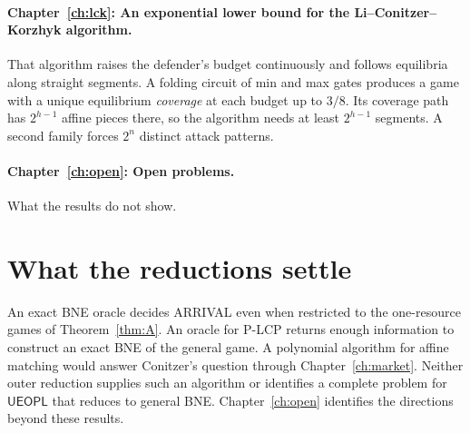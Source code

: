 \paragraph{Chapter~\ref{ch:lck}: An exponential lower bound for the Li--Conitzer--Korzhyk algorithm.} That algorithm raises
the defender's budget continuously and follows equilibria along straight segments. A folding circuit of
min and max gates produces a game with a unique equilibrium \emph{coverage}
at each budget up to $3/8$. Its coverage path has $2^{h-1}$ affine pieces there, so the algorithm
needs at least $2^{h-1}$ segments. A second family forces $2^n$ distinct attack patterns.

\paragraph{Chapter~\ref{ch:open}: Open problems.} What the results do not show.

\section{What the reductions settle}

An exact BNE oracle decides ARRIVAL even when restricted to the one-resource
games of Theorem~\ref{thm:A}. An oracle for P-LCP returns enough information
to construct an exact BNE of the general game. A polynomial algorithm for
affine matching would answer Conitzer's question through Chapter~\ref{ch:market}.
Neither outer reduction supplies such an algorithm or identifies a complete
problem for $\mathsf{UEOPL}$ that reduces to general BNE. Chapter~\ref{ch:open}
identifies the directions beyond these results.
